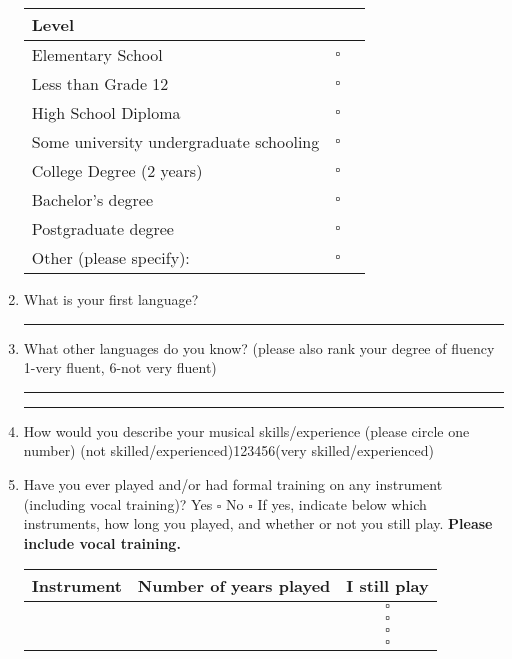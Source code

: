 \documentclass[12pt, a4paper]{article}
\begin{document}
\begin{enumerate}
\vspace{4pt}
\begin{tabular}{|m{12.2cm}|l|c|}
\hline
\textbf{Level} & \\ \hline
Elementary School & $\square$ \\[5pt] \hline
Less than Grade 12 & $\square$ \\[5pt] \hline
High School Diploma & $\square$ \\[5pt] \hline
Some university undergraduate schooling & $\square$ \\[5pt] \hline
College Degree (2 years) & $\square$ \\[5pt] \hline
Bachelor's degree & $\square$ \\[5pt] \hline
Postgraduate degree & $\square$ \\[5pt] \hline
Other (please specify):  & $\square$ \\[5pt] \hline
\end{tabular}
\vspace{12pt}
\item What is your first language? \rule{5cm}{0.5pt}
\item What other languages do you know? 
\newline(please also rank your degree of fluency 1-very fluent, 6-not very fluent)
\newline\rule{15cm}{0.5pt}
\newline\rule{15cm}{0.5pt}
\vspace{12pt}
\item How would you describe your musical skills/experience (please circle one number)
\newline (not skilled/experienced)\hspace{12pt}1\hspace{12pt}2\hspace{12pt}3\hspace{12pt}4\hspace{12pt}5\hspace{12pt}6\hspace{12pt}(very skilled/experienced) 
\newpage
\item Have you ever played and/or had formal training on any instrument (including vocal training)? \hspace{12pt} Yes $\square$ No $\square$
\newline If yes, indicate below which instruments, how long you played, and whether or not you still play. \textbf {Please include vocal training.}

\begin{tabular}{|m{5cm}|l|c|}
\hline 
\textbf{Instrument} & \textbf{Number of years played} & \textbf{I still play}\\ \hline
 & & $\square$ \\[5pt] \hline
 & & $\square$ \\[5pt] \hline
 & & $\square$ \\[5pt] \hline
 & & $\square$ \\[5pt] \hline
\end{tabular}


\end{enumerate}
\end{document}
